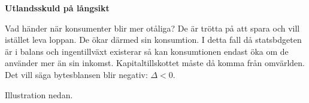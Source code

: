 \documentclass{article}
\begin{document}
\vspace{5mm} \par \noindent 

\textbf{Utlandsskuld på långsikt}
\vspace{5mm} \par \noindent 

Vad händer när konsumenter blir mer otåliga? De är trötta på att spara och vill istället leva loppan. De ökar därmed sin konsumtion. I detta fall då statsbdgeten är i balans och ingentillväxt existerar så kan konsumtionen endast öka om de använder mer än sin inkomst. Kapitaltillskottet måste då komma från omvärlden. Det vill säga bytesblansen blir negativ: $ \Delta < 0 $. 

Illustration nedan.





\end{document}
